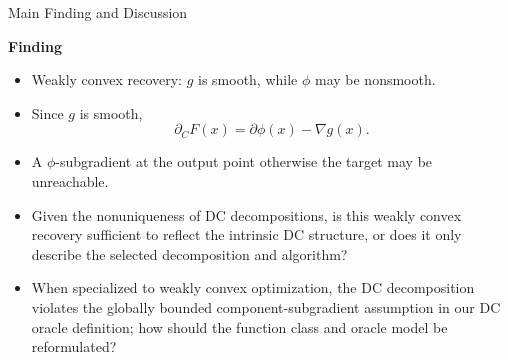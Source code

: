 \documentclass[10pt]{beamer}
\begin{document}
\begin{frame}{Main Finding and Discussion}
\small

\textbf{Finding}
\begin{itemize}\setlength{\itemsep}{3pt}
    \item Weakly convex recovery: $g$ is smooth, while $\phi$ may be
    nonsmooth.
    \item Since $g$ is smooth,
    \[
        \partial_C F(x)=\partial\phi(x)- \nabla g(x).
    \]
        \item A $\phi$-subgradient at the output point  otherwise the
    target may be unreachable.
\end{itemize}

\medskip
{}
\begin{itemize}\setlength{\itemsep}{3pt}
    \item Given the nonuniqueness of DC decompositions, is this 
    weakly convex recovery sufficient to reflect the intrinsic DC structure,
    or does it only describe the selected decomposition and algorithm?

    \item  When specialized to weakly convex optimization, the DC decomposition violates the globally bounded component-subgradient assumption in our DC oracle definition; how should the function class and oracle model be reformulated?
\end{itemize}
\end{frame}
\end{document}

